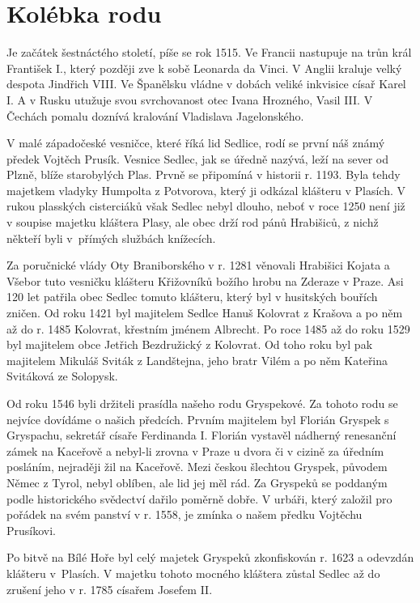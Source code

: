 \documentclass[../dejiny-rodu-prusiku.tex]{subfiles}
\begin{document}

\section{Kolébka rodu}

Je začátek šestnáctého století, píše se rok 1515. Ve Francii nastupuje na trůn král František I., který později zve k sobě Leonarda da Vinci. V Anglii kraluje velký despota Jindřich VIII. Ve Španělsku vládne v dobách veliké inkvisice císař Karel I. A v Rusku utužuje svou svrchovanost otec Ivana Hrozného, Vasil III. V Čechách pomalu doznívá kralování Vladislava Jagelonského.

V malé západočeské vesničce, které říká lid Sedlice, rodí se první náš známý předek Vojtěch Prusík. Vesnice Sedlec, jak se úředně nazývá, leží na sever od Plzně, blíže starobylých Plas. Prvně se připomíná v historii r. 1193. Byla tehdy majetkem vladyky Humpolta z Pot­vorova, který ji odkázal klášteru v Plasích. V rukou plasských cisterciáků však Sedlec nebyl dlouho, neboť v roce 1250 není již v soupise majetku kláštera Plasy, ale obec drží rod pánů Hrabišiců, z nichž někteří byli v~přímých službách knížecích.

Za poručnické vlády Oty Braniborského v r. 1281 věnovali Hrabišici Kojata a Všebor tuto vesničku klášteru Křižovníků božího hrobu na Zderaze v Praze. Asi 120 let patři­la obec Sedlec tomuto klášteru, který byl v husitských bouřích zničen. Od roku 1421 byl majitelem Sedlce Hanuš Kolovrat z Krašova a po něm až do r. 1485 Kolovrat, křest­ním jménem Albrecht. Po roce 1485 až do roku 1529 byl majitelem obce Jetřich Bezdružický z Kolovrat. Od toho roku byl pak majitelem Mikuláš Sviták z Landštejna, jeho bratr Vilém a po něm Kateřina Svitáková ze Solopysk.

Od roku 1546 byli držiteli prasídla našeho rodu Gryspekové. Za tohoto rodu se nejvíce dovídáme o našich předcích. Prvním majitelem byl Florián Gryspek s Gryspachu, sekretář císa­ře Ferdinanda I. Florián vystavěl nádherný renesanční zámek na Kaceřově a nebyl-li zrovna v Praze u dvora či v ci­zině za úředním posláním, nejraději žil na Kaceřově. Mezi českou šlechtou Gryspek, původem Němec z Tyrol, nebyl oblí­ben, ale lid jej měl rád. Za Gryspeků se poddaným podle historického svědectví dařilo poměrně dobře. V urbáři, kte­rý založil pro pořádek na svém panství v r. 1558, je zmínka o našem předku Vojtěchu Prusíkovi.

Po bitvě na Bílé Hoře byl celý majetek Gryspeků zkonfiskován r. 1623 a odevzdán klášteru v~Plasích. V majetku toho­to mocného kláštera zůstal Sedlec až do zrušení jeho v r. 1785 císařem Josefem II.
\end{document}
